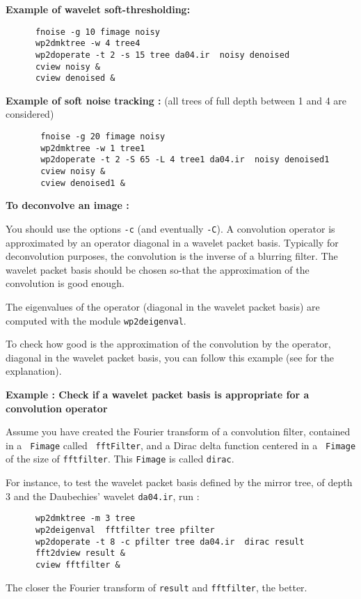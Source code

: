 \medskip
{\bf Example of wavelet soft-thresholding:}
\begin{verbatim}
      fnoise -g 10 fimage noisy
      wp2dmktree -w 4 tree4
      wp2doperate -t 2 -s 15 tree da04.ir  noisy denoised
      cview noisy &
      cview denoised &
\end{verbatim}

\medskip
{\bf  Example of soft noise tracking :}
(all trees of full depth between 1 and 4 are considered)
 \begin{verbatim}
       fnoise -g 20 fimage noisy
       wp2dmktree -w 1 tree1
       wp2doperate -t 2 -S 65 -L 4 tree1 da04.ir  noisy denoised1
       cview noisy &
       cview denoised1 &
 \end{verbatim}

\medskip
{\bf {\large  To deconvolve an image :}} 
  
You should use the options \verb+-c+ (and eventually \verb+-C+).
A convolution operator is approximated by an operator diagonal in a 
wavelet packet basis. Typically for deconvolution purposes, the convolution is 
the inverse of a blurring filter. The wavelet packet basis should be
chosen so-that the approximation of the convolution is good enough.

The eigenvalues of the operator (diagonal in the  wavelet packet
basis) are computed with the module \verb+wp2deigenval+. 
 
To check how good is the approximation of the convolution by the
operator, diagonal in the wavelet packet basis, you can follow this
example (see \cite{malgouyres:framework} for the explanation).

\medskip
{\bf Example : Check if a wavelet packet basis is appropriate for a
  convolution operator}

Assume you have created the Fourier transform of a convolution
filter, contained in a \verb+ Fimage+ called \verb+ fftFilter+,
and a Dirac delta function centered in  a \verb+ Fimage+ of the size
of \verb+fftfilter+. This \verb+Fimage+ is called \verb+dirac+.

For instance, to test the wavelet packet basis defined by the mirror tree,
of depth $3$ and the Daubechies' wavelet \verb+da04.ir+, run :
\begin{verbatim}
      wp2dmktree -m 3 tree
      wp2deigenval  fftfilter tree pfilter
      wp2doperate -t 8 -c pfilter tree da04.ir  dirac result
      fft2dview result &
      cview fftfilter &
\end{verbatim}
The closer the Fourier transform of  \verb+result+ and \verb+fftfilter+,
the better.

